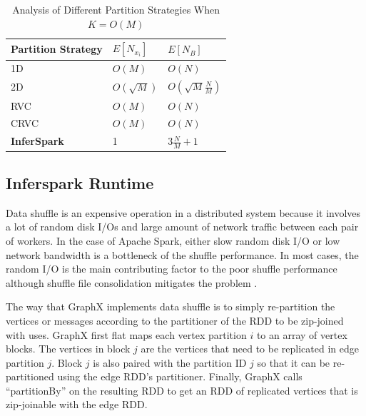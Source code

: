 \begin{table}[h]
	\centering
	\caption{Analysis of Different Partition Strategies When $K = O(M)$}
	\label{tab:max_v_per_edge_part_OM}
	\small
	\begin{tabular}{lll}
		\hline
		Partition Strategy & $E[N_{x_i}]$ & $E[N_B]$\\\hline\hline
		1D & $O(M)$ & $O(N)$ \\\hline
		2D & $O(\sqrt{M})$ & $O(\sqrt{M}\frac{N}{M})$ \\\hline
		RVC & $O(M)$ & $O(N)$ \\\hline
		CRVC & $O(M)$ & $O(N)$ \\\hline
		{\bf InferSpark} & 1 & $3\frac{N}{M}+1$ \\\hline
	\end{tabular}
\end{table}

\subsection{Inferspark Runtime}
\label{sec:optimize_shuffle}

%

Data shuffle is an expensive operation in a distributed system because it
involves a lot of random disk I/Os and large amount of network traffic between each
pair of workers. In the case of Apache Spark, either slow random disk I/O or
low network bandwidth is a bottleneck of the shuffle performance. In most
cases, the random I/O is the main contributing factor to the poor shuffle
performance although shuffle file consolidation mitigates the problem
\cite{spark-shuffle}.

The way that GraphX implements data shuffle is to simply re-partition the
vertices or messages according to the partitioner of the RDD to be zip-joined
with uses. GraphX first flat maps each vertex partition $i$ to an array of
vertex blocks. The vertices in block $j$ are the vertices that need to be
replicated in edge partition $j$.  Block $j$ is also paired with the partition
ID $j$ so that it can be re-partitioned using the edge RDD's partitioner.
Finally, GraphX calls ``partitionBy'' on the resulting RDD to get an RDD of
replicated vertices that is zip-joinable with the edge RDD.

